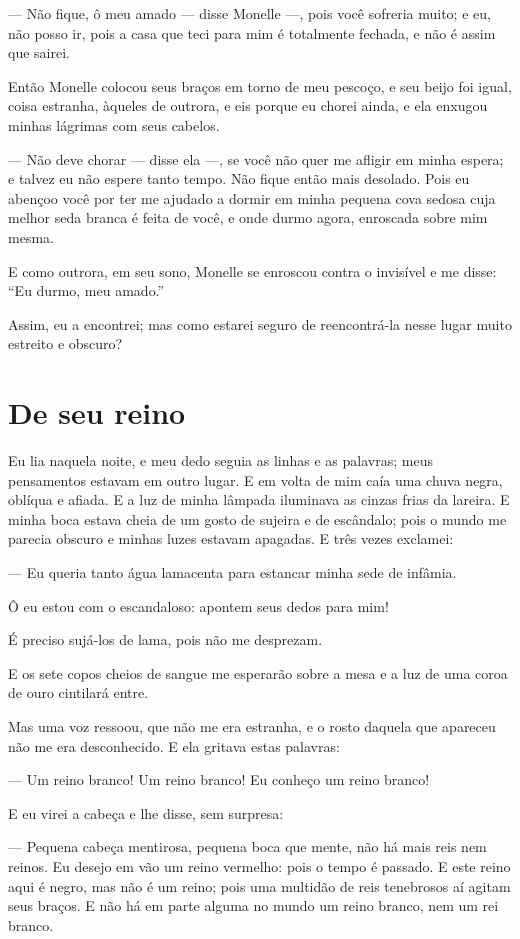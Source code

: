 --- Não fique, ô meu amado --- disse Monelle ---, pois você sofreria muito; e
eu, não posso ir, pois a casa que teci para mim é totalmente fechada, e
não é assim que sairei.

Então Monelle colocou seus braços em torno de meu pescoço, e seu beijo
foi igual, coisa estranha, àqueles de outrora, e eis porque eu chorei
ainda, e ela enxugou minhas lágrimas com seus cabelos.

--- Não deve chorar --- disse ela ---, se você não quer me afligir em minha
espera; e talvez eu não espere tanto tempo. Não fique então mais desolado.
Pois eu abençoo você por ter me ajudado a dormir em minha pequena cova
sedosa cuja melhor seda branca é feita de você, e onde durmo agora,
enroscada sobre mim mesma.

E como outrora, em seu sono, Monelle se enroscou contra o invisível e
me disse: “Eu durmo, meu amado.”

Assim, eu a encontrei; mas como estarei seguro de reencontrá-la nesse
lugar muito estreito e obscuro?

\section*{De seu reino}

Eu lia naquela noite, e meu dedo seguia as linhas e as palavras; meus
pensamentos estavam em outro lugar. E em volta de mim caía uma chuva
negra, oblíqua e afiada. E a luz de minha lâmpada iluminava as cinzas
frias da lareira. E minha boca estava cheia de um gosto de sujeira e de
escândalo; pois o mundo me parecia obscuro e minhas luzes estavam
apagadas. E três vezes exclamei:

--- Eu queria tanto água lamacenta para estancar minha sede de infâmia.

Ô eu estou com o escandaloso: apontem seus dedos para mim!

É preciso sujá-los de lama, pois não me desprezam.

E os sete copos cheios de sangue me esperarão sobre a mesa e a luz de
uma coroa de ouro cintilará entre.

Mas uma voz ressoou, que não me era estranha, e o rosto daquela que
apareceu não me era desconhecido. E ela gritava estas palavras:

--- Um reino branco! Um reino branco! Eu conheço um reino branco!

E eu virei a cabeça e lhe disse, sem surpresa:

--- Pequena cabeça mentirosa, pequena boca que mente, não há mais reis
nem reinos. Eu desejo em vão um reino vermelho: pois o tempo é passado. E
este reino aqui é negro, mas não é um reino; pois uma multidão de reis
tenebrosos aí agitam seus braços. E não há em parte alguma no mundo um
reino branco, nem um rei branco.

